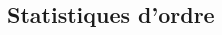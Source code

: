 \documentclass[10pt, french]{article}
\begin{document}
\begin{multicols*}{2}
%	





\subsection*{Statistiques d'ordre}


\end{multicols*}
\end{document}
